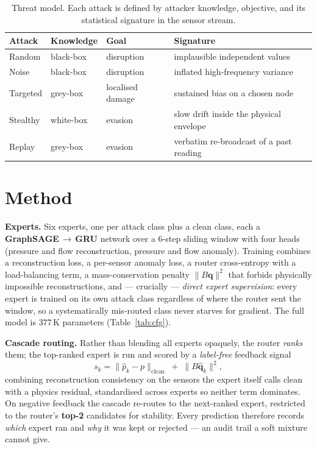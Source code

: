 \documentclass[10pt,a4paper]{article}
\begin{document}
\begin{table}[!htb]
\centering\small
\caption{Threat model. Each attack is defined by attacker knowledge,
objective, and its statistical signature in the sensor stream.}
\label{tab:threat}
\begin{tabularx}{\linewidth}{@{}l l l L@{}}
\toprule
\textbf{Attack} & \textbf{Knowledge} & \textbf{Goal} & \textbf{Signature}\\
\midrule
Random   & black-box & disruption      & implausible independent values\\
Noise    & black-box & disruption      & inflated high-frequency variance\\
Targeted & grey-box  & localised damage & sustained bias on a chosen node\\
Stealthy & white-box & evasion         & slow drift inside the physical envelope\\
Replay   & grey-box  & evasion         & verbatim re-broadcast of a past reading\\
\bottomrule
\end{tabularx}
\end{table}

\section{Method}

\textbf{Experts.} Six experts, one per attack class plus a clean class,
each a \textbf{GraphSAGE\,$\to$\,GRU} network over a 6-step sliding window
with four heads (pressure and flow reconstruction, pressure and flow
anomaly). Training combines a reconstruction loss, a per-sensor anomaly
loss, a router cross-entropy with a load-balancing term, a
mass-conservation penalty $\lVert B\mathbf{q}\rVert^2$ that forbids
physically impossible reconstructions, and --- crucially ---
\emph{direct expert supervision}: every expert is trained on its own attack
class regardless of where the router sent the window, so a systematically
mis-routed class never starves for gradient. The full model is 377\,K
parameters (Table~\ref{tab:cfg}).

\textbf{Cascade routing.} Rather than blending all experts opaquely, the
router \emph{ranks} them; the top-ranked expert is run and scored by a
\emph{label-free} feedback signal
\[
  s_k = \big\lVert \hat{p}_k - p\big\rVert_{\text{clean}}
        \;+\; \big\lVert B\hat{\mathbf q}_k\big\rVert^2 ,
\]
combining reconstruction consistency on the sensors the expert itself calls
clean with a physics residual, standardised across experts so neither term
dominates. On negative feedback the cascade re-routes to the next-ranked
expert, restricted to the router's \textbf{top-2} candidates for stability.
Every prediction therefore records \emph{which} expert ran and \emph{why}
it was kept or rejected --- an audit trail a soft mixture cannot give.
\end{document}
